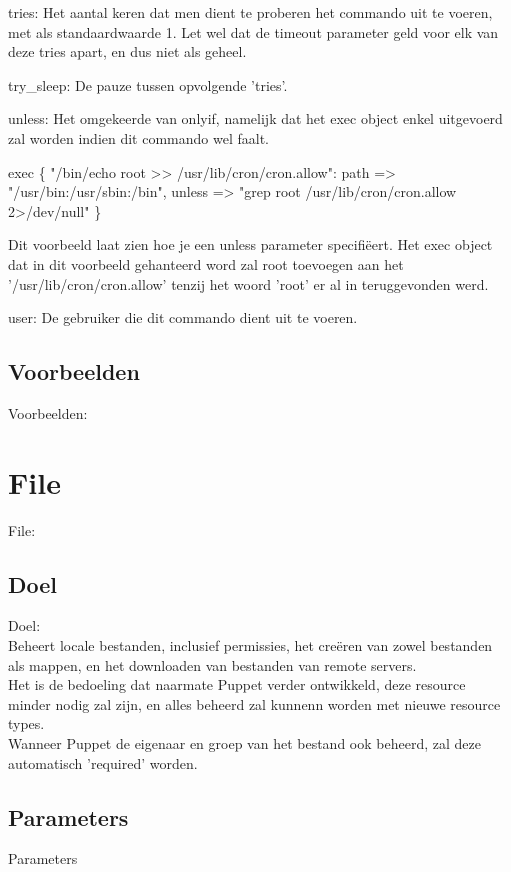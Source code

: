 		tries:
		Het aantal keren dat men dient te proberen het commando uit te voeren, met als standaardwaarde 1.
		Let wel dat de timeout parameter geld voor elk van deze tries apart, en dus niet als geheel.

		try\_sleep:
		De pauze tussen opvolgende 'tries'.

		unless:
		Het omgekeerde van onlyif, namelijk dat het exec object enkel uitgevoerd zal worden indien dit commando wel faalt.

			exec \{ "/bin/echo root >> /usr/lib/cron/cron.allow":
				path => "/usr/bin:/usr/sbin:/bin",
				unless => "grep root /usr/lib/cron/cron.allow 2>/dev/null"
			\}

		Dit voorbeeld laat zien hoe je een unless parameter specifi\"{e}ert.
		Het exec object dat in dit voorbeeld gehanteerd word zal root toevoegen aan het '/usr/lib/cron/cron.allow' tenzij het woord 'root' er al in teruggevonden werd.

		user:
		De gebruiker die dit commando dient uit te voeren.

\subsection{Voorbeelden}
Voorbeelden:

\section{File}
File:\\
\subsection{Doel}
Doel:\\
	Beheert locale bestanden, inclusief permissies, het cre\"{e}ren van zowel bestanden als mappen, en het downloaden van bestanden van remote servers.\\
	Het is de bedoeling dat naarmate Puppet verder ontwikkeld, deze resource minder nodig zal zijn, en alles beheerd zal kunnenn worden met nieuwe resource types.\\

	Wanneer Puppet de eigenaar en groep van het bestand ook beheerd, zal deze automatisch 'required' worden.\\

\subsection{Parameters}
	Parameters\\

